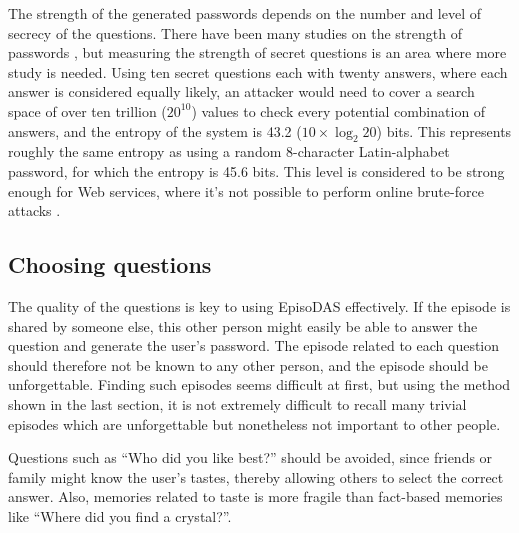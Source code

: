 \documentclass[sigconf]{acmart}
\begin{document}
The strength of the generated passwords depends on the number and 
level of secrecy of the questions.
%
There have been many studies on the strength of passwords
\cite{Hayashi:2011:DSP:1978942.1979326,Komanduri:2011:PPM:1978942.1979321}, %
but measuring the strength of secret questions is an area where more study is needed.
Using ten secret questions each with twenty answers, where each answer is considered equally likely,
an attacker would need to cover a search space of over ten trillion ($20^{10}$) values to check
every potential combination of answers,
and the entropy of the system is 43.2 ($10 \times \log_2 20$) bits.  %
%
This represents roughly the same entropy as using a random 8-character Latin-alphabet
password, for which the entropy is 45.6 bits.
This level is considered to be strong enough for Web services,
where it's not possible to perform online brute-force attacks \cite{Florencio:2007:SWP:1361419.1361429}.
  
\subsection{Choosing questions}

The quality of the questions is key to using EpisoDAS effectively.  If
the episode is shared by someone else, this other person might easily
be able to answer the question and generate the user's password.
%
The episode related to each question should therefore not be known to any other person,
and the episode should be unforgettable.
%
Finding such episodes seems difficult at first,
but using the method shown in the last section,
it is not extremely difficult to recall
many trivial episodes which are unforgettable but
nonetheless not important to other people.

Questions such as ``Who did you like best?'' should be avoided,
since friends or family might know the user's tastes, thereby allowing 
others to select the correct answer.
Also, memories related to taste is more fragile than fact-based memories like
``Where did you find a crystal?''.

% 
\end{document}
